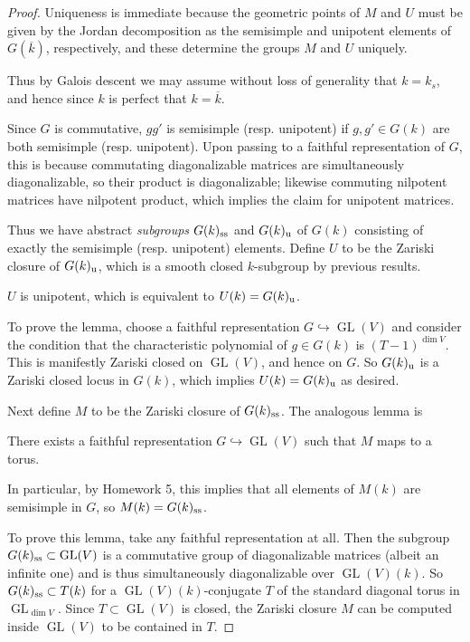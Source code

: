 \documentclass[10pt]{article}
\newcommand{\GL}{\operatorname{GL}}
\renewcommand{\(}{\left(}
\renewcommand{\)}{\right)}
\renewcommand{\bar}{\overline}
\newcommand{\into}{\hookrightarrow}
\numberwithin{thm}{subsection}
\begin{document}
\begin{proof}
Uniqueness is immediate because the geometric points of $M$ and $U$ must be given
by the Jordan decomposition
as the semisimple and unipotent elements of $G(\bar k)$, respectively,
and these determine the groups $M$ and $U$ uniquely.

Thus by Galois descent we may assume without loss of generality
that $k=k_s$, and hence since $k$ is perfect
that $k=\bar k$.

Since $G$ is commutative,
$gg'$ is semisimple (resp. unipotent)
if $g,g'\in G(k)$ are both semisimple (resp. unipotent).
Upon passing to a faithful representation of $G$, this is because commutating diagonalizable matrices are simultaneously
diagonalizable, so their product is diagonalizable;
likewise commuting nilpotent matrices have nilpotent product, which implies
the claim for unipotent matrices.

Thus we have abstract \textit{subgroups}
$G(k)_{\rm{ss}}$ and $G(k)_{\rm{u}}$
of $G(k)$ consisting of exactly the semisimple (resp. unipotent) elements.
Define $U$ to be the Zariski closure of $G(k)_{\rm{u}}$,
which is a smooth closed $k$-subgroup by previous results.
\begin{lem}
$U$ is unipotent, which is equivalent to $U(k)=G(k)_{\rm{u}}$.
\end{lem}
To prove the lemma, choose a faithful representation $G\into \GL(V)$
and consider the condition that the characteristic polynomial of
$g\in G(k)$ is $(T-1)^{\dim V}$. This is manifestly Zariski closed
on $\GL(V)$, and hence on $G$.
So $G(k)_{\rm{u}}$ is a Zariski closed locus in $G(k)$,
which implies $U(k)=G(k)_{\rm{u}}$ as desired.

Next define $M$ to be the Zariski closure of $G(k)_{\rm{ss}}$.
The analogous lemma is
\begin{lem}
There exists a faithful representation $G\into \GL(V)$ such 
that $M$ maps to a torus.
\end{lem}
In particular, by Homework 5, this implies that all elements of $M(k)$ are semisimple in $G$, 
so $M(k)=G(k)_{\rm{ss}}$.

To prove this lemma, take any faithful representation at all.
Then the subgroup $G(k)_{\rm{ss}}\subset \GL(V)$ is a commutative group of diagonalizable matrices
(albeit an infinite one)
and is thus simultaneously diagonalizable
over $\GL(V)(k)$.
So $G(k)_{\rm{ss}}\subset T(k)$
for a $\GL(V)(k)$-conjugate $T$
of the standard diagonal torus in $\GL_{\dim V}$.
Since $T\subset \GL(V)$ is closed,
the Zariski closure $M$ can be computed inside $\GL(V)$
to be contained in $T$.


\end{proof}
\end{document}

